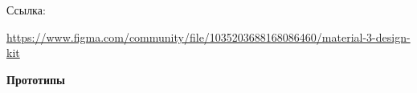 Ссылка:

\url{https://www.figma.com/community/file/1035203688168086460/material-3-design-kit}
\bigskip

\textbf{Прототипы}
\bigskip

\noindent
\begin{minipage}{\linewidth}
\end{minipage}
\bigskip

\noindent
\begin{minipage}{\linewidth}
\end{minipage}
\bigskip

